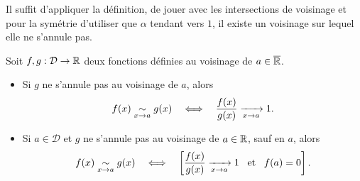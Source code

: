 \documentclass{magnoliaold}
\begin{document}
\begin{preuve}
Il suffit d'appliquer la définition, de jouer avec les intersections de voisinage et pour la symétrie d'utiliser que $\alpha$ tendant vers $1$, il existe un voisinage sur lequel elle ne s'annule pas.
\end{preuve}


\begin{proposition}[utile=-3]
Soit $f,g:\mathcal{D}\to\mathbb{R}$ deux fonctions définies au voisinage de $a\in\overline{\mathbb{R}}$.
\begin{itemize}
\item Si $g$ ne s'annule pas au voisinage de $a$, alors
  \[f(x)\underset{x\rightarrow a}{\sim} g(x) \quad\Longleftrightarrow\quad
    \frac{f(x)}{g(x)}\xrightarrow[x\rightarrow a]{} 1.\]
\item Si $a\in\mathcal{D}$ et $g$ ne s'annule pas au voisinage de $a\in\mathbb{R}$, sauf en $a$, alors
  \[f(x)\underset{x\rightarrow a}{\sim} g(x) \quad\Longleftrightarrow\quad
    \left[\frac{f(x)}{g(x)}\xrightarrow[x\rightarrow a]{} 1 \quad\!\text{et}\quad\! f(a)=0\right].\]
\end{itemize}
\end{proposition}

\end{document}
